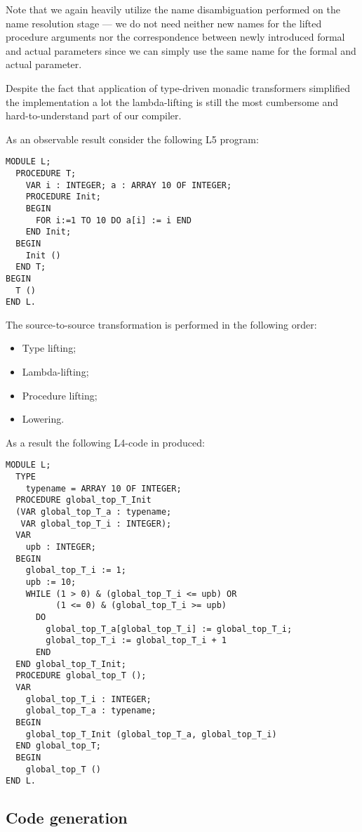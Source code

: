 Note that we again heavily utilize the name disambiguation performed on the name resolution stage --- we do
not need neither new names for the lifted procedure arguments nor the correspondence between newly introduced
formal and actual parameters since we can simply use the same name for the formal and actual parameter.

Despite the fact that application of type-driven monadic transformers simplified the implementation a lot the
lambda-lifting is still the most cumbersome and hard-to-understand part of our compiler.

As an observable result consider the following L5 program:

\begin{lstlisting}[language=oberon0]
MODULE L;
  PROCEDURE T;
    VAR i : INTEGER; a : ARRAY 10 OF INTEGER;
    PROCEDURE Init;
    BEGIN
      FOR i:=1 TO 10 DO a[i] := i END
    END Init;
  BEGIN
    Init ()  
  END T;
BEGIN
  T ()
END L.
\end{lstlisting}

The source-to-source transformation is performed in the following order:

\begin{itemize}
\item Type lifting;
\item Lambda-lifting;
\item Procedure lifting;
\item Lowering.
\end{itemize}

As a result the following L4-code in produced:

\begin{lstlisting}[language=oberon0]
MODULE L;
  TYPE
    typename = ARRAY 10 OF INTEGER;
  PROCEDURE global_top_T_Init 
  (VAR global_top_T_a : typename; 
   VAR global_top_T_i : INTEGER);
  VAR
    upb : INTEGER;
  BEGIN
    global_top_T_i := 1; 
    upb := 10; 
    WHILE (1 > 0) & (global_top_T_i <= upb) OR 
          (1 <= 0) & (global_top_T_i >= upb)
      DO
        global_top_T_a[global_top_T_i] := global_top_T_i; 
        global_top_T_i := global_top_T_i + 1
      END
  END global_top_T_Init;
  PROCEDURE global_top_T ();
  VAR
    global_top_T_i : INTEGER;
    global_top_T_a : typename;
  BEGIN
    global_top_T_Init (global_top_T_a, global_top_T_i)
  END global_top_T;
  BEGIN
    global_top_T ()
END L.
\end{lstlisting}

\subsection{Code generation}

